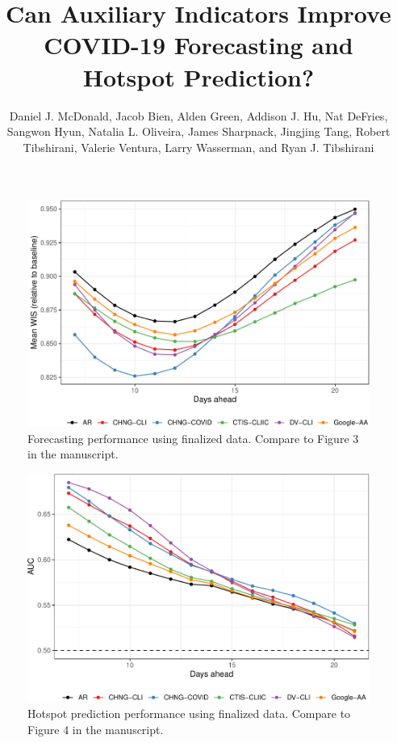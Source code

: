 \documentclass[9pt,twoside,lineno]{pnas-new}
\title{Can Auxiliary Indicators Improve COVID-19 Forecasting and Hotspot  
  Prediction?}
\author{Daniel J. McDonald, Jacob Bien, Alden Green, Addison J. Hu, Nat DeFries,
  Sangwon Hyun, Natalia L. Oliveira, James Sharpnack, Jingjing Tang, Robert
  Tibshirani, Valerie Ventura, Larry Wasserman, and Ryan J. Tibshirani}
\begin{document}
\maketitle


\SItext





\begin{figure}

{\centering \includegraphics[width=\textwidth]{fig/fcast-finalized-1} 

}

\caption{Forecasting performance using finalized data. Compare to Figure 3 in the manuscript.}\label{fig:fcast-finalized}
\end{figure}

\clearpage

\begin{figure}

{\centering \includegraphics[width=\textwidth]{fig/hot-finalized-1} 

}

\caption{Hotspot prediction performance using finalized data. Compare to Figure 4 in the manuscript.}\label{fig:hot-finalized}
\end{figure}
\end{document}
